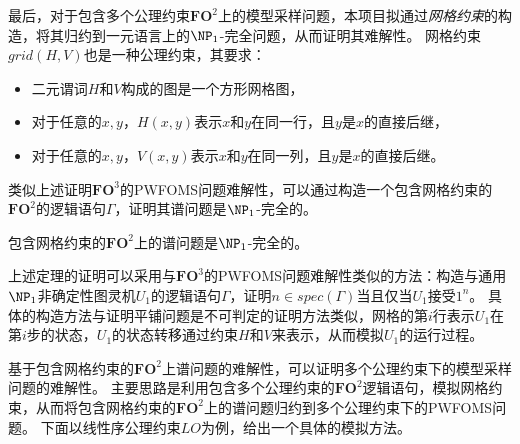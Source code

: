 \documentclass[12pt,UTF8,AutoFakeBold=3,a4paper]{ctexart} %
\newcommand{\sentence}{\Gamma}
\newcommand{\fotwo}{\ensuremath{\mathbf{FO}^2}}
\newcommand{\fothree}{\ensuremath{\mathbf{FO}^3}}
\begin{document}
最后，对于包含多个公理约束\fotwo{}上的模型采样问题，本项目拟通过\emph{网格约束}的构造，将其归约到一元语言上的$\NP_1$-完全问题，从而证明其难解性。
网格约束$grid(H, V)$也是一种公理约束，其要求：
\begin{itemize}
  \item 二元谓词$H$和$V$构成的图是一个方形网格图，
  \item 对于任意的$x,y$，$H(x,y)$表示$x$和$y$在同一行，且$y$是$x$的直接后继，
  \item 对于任意的$x,y$，$V(x,y)$表示$x$和$y$在同一列，且$y$是$x$的直接后继。
\end{itemize}
类似上述证明\fothree{}的PWFOMS问题难解性，可以通过构造一个包含网格约束的\fotwo{}的逻辑语句$\sentence$，证明其谱问题是$\NP_1$-完全的。
\begin{theorem}\label{thm:grid_hard}
  包含网格约束的\fotwo{}上的谱问题是$\NP_1$-完全的。
\end{theorem}

上述定理的证明可以采用与\fothree{}的PWFOMS问题难解性类似的方法：构造与通用$\NP_1$非确定性图灵机$U_1$的逻辑语句$\sentence$，证明$n\in spec(\sentence)$当且仅当$U_1$接受$1^n$。
具体的构造方法与证明平铺问题是不可判定的证明方法类似，网格的第$i$行表示$U_1$在第$i$步的状态，$U_1$的状态转移通过约束$H$和$V$来表示，从而模拟$U_1$的运行过程。

基于包含网格约束的\fotwo{}上谱问题的难解性，可以证明多个公理约束下的模型采样问题的难解性。
主要思路是利用包含多个公理约束的\fotwo{}逻辑语句，模拟网格约束，从而将包含网格约束的\fotwo{}上的谱问题归约到多个公理约束下的PWFOMS问题。
下面以线性序公理约束$LO$为例，给出一个具体的模拟方法。
\end{document}
